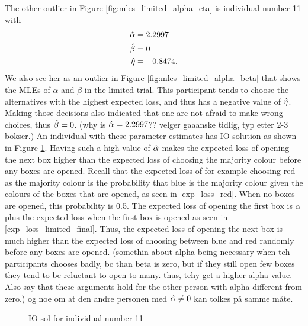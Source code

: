 The other outlier in Figure \ref{fig:mles_limited_alpha_eta} is individual number 11 with 
\begin{equation}
\label{mles_lim_person11}
    \begin{aligned}
        \hat{\alpha} &= 2.2997 \\
        \hat{\beta} &= 0 \\
        \hat{\eta} &= -0.8474.
    \end{aligned}
\end{equation}
We also see her as an outlier in Figure \ref{fig:mles_limited_alpha_beta} that shows the MLEs of $\alpha$ and $\beta$ in the limited trial. This participant tends to choose the alternatives with the highest expected loss, and thus has a negative value of $\hat{\eta}$. Making those decisions also indicated that one are not afraid to make wrong choices, thus $\hat{\beta}=0$. (why is $\hat{\alpha}=2.2997$?? velger gaaanske tidlig, typ etter 2-3 bokser.) An individual with these parameter estimates has IO solution as shown in Figure \ref{fig:IO_sol_person_11_lim}. Having such a high value of $\hat{\alpha}$ makes the expected loss of opening the next box higher than the expected loss of choosing the majority colour before any boxes are opened. Recall that the expected loss of for example choosing red as the majority colour is the probability that blue is the majority colour given the colours of the boxes that are opened, as seen in \eqref{exp_loss_red}. When no boxes are opened, this probability is 0.5. The expected loss of opening the first box is $\alpha$ plus the expected loss when the first box is opened as seen in \eqref{exp_loss_limited_final}. Thus, the expected loss of opening the next box is much higher than the expected loss of choosing between blue and red randomly before any boxes are opened. (somethin about alpha being necessary when teh participants chooses badly, bc than beta is zero, but if they still open few boxes they tend to be reluctant to open to many. thus, tehy get a higher alpha value. Also say that these arguments hold for the other person with alpha different from zero.)
og noe om at den andre personen med $\hat{\alpha} \neq 0$ kan tolkes på samme måte. 
\begin{figure}
    \centering
    \scalebox{0.8}{}
    \caption[IO solution for individual number 11, limited]{IO sol for individual number 11}
    \label{fig:IO_sol_person_11_lim}
\end{figure}





